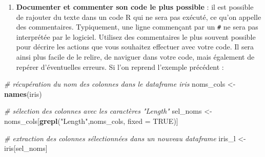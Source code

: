 \documentclass[
  11pt,
  french,
]{book}
\makeatletter
\newenvironment{Shaded}{\begin{snugshade}}{\end{snugshade}}
\newcommand{\CommentTok}[1]{\textcolor[rgb]{0.56,0.35,0.01}{\textit{#1}}}
\newcommand{\DataTypeTok}[1]{\textcolor[rgb]{0.13,0.29,0.53}{#1}}
\newcommand{\KeywordTok}[1]{\textcolor[rgb]{0.13,0.29,0.53}{\textbf{#1}}}
\newcommand{\NormalTok}[1]{#1}
\newcommand{\OtherTok}[1]{\textcolor[rgb]{0.56,0.35,0.01}{#1}}
\newcommand{\StringTok}[1]{\textcolor[rgb]{0.31,0.60,0.02}{#1}}
\providecommand{\tightlist}{%
  \setlength{\itemsep}{0pt}\setlength{\parskip}{0pt}}
\newenvironment{kframe}{%
\medskip{}
\setlength{\fboxsep}{.8em}
 \def\at@end@of@kframe{}%
 \ifinner\ifhmode%
  \def\at@end@of@kframe{\end{minipage}}%
  \begin{minipage}{\columnwidth}%
 \fi\fi%
 \def\FrameCommand##1{\hskip\@totalleftmargin \hskip-\fboxsep
 \colorbox{shadecolor}{##1}\hskip-\fboxsep
     \hskip-\linewidth \hskip-\@totalleftmargin \hskip\columnwidth}%
 \MakeFramed {\advance\hsize-\width
   \@totalleftmargin\z@ \linewidth\hsize
   \@setminipage}}%
 {\par\unskip\endMakeFramed%
 \at@end@of@kframe}
\renewenvironment{Shaded}{\begin{kframe}}{\end{kframe}}
\makeatother
\begin{document}
\begin{enumerate}
\def\labelenumi{\arabic{enumi}.}
\setcounter{enumi}{1}
\tightlist
\item
  \textbf{Documenter et commenter son code le plus possible} : il est possible de rajouter du texte dans un code R qui ne sera pas exécuté, ce qu'on appelle des commentaires. Typiquement, une ligne commençant par un \texttt{\#} ne sera pas interprétée par le logiciel. Utilisez des commentaires le plus souvent possible pour décrire les actions que vous souhaitez effectuer avec votre code. Il sera ainsi plus facile de le relire, de naviguer dans votre code, mais également de repérer d'éventuelles erreurs. Si l'on reprend l'exemple précédent :
\end{enumerate}

\begin{Shaded}
\begin{Highlighting}[]
\CommentTok{# récupération du nom des colonnes dans le dataframe iris}
\NormalTok{noms_cols <-}\StringTok{ }\KeywordTok{names}\NormalTok{(iris)}

\CommentTok{# sélection des colonnes avec les caractères "Length"}
\NormalTok{sel_noms <-}\StringTok{ }\NormalTok{noms_cols[}\KeywordTok{grepl}\NormalTok{(}\StringTok{"Length"}\NormalTok{,noms_cols, }\DataTypeTok{fixed =} \OtherTok{TRUE}\NormalTok{)]}

\CommentTok{# extraction des colonnes sélectionnées dans un nouveau dataframe}
\NormalTok{iris_l <-}\StringTok{ }\NormalTok{iris[sel_noms]}
\end{Highlighting}
\end{Shaded}
\end{document}
